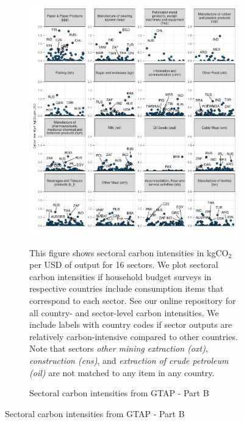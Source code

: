\clearpage

\begin{figure}[ht!]\ContinuedFloat
\begin{subfigure}[b]{\textwidth}
  \centering
  \includegraphics{Analysis_Carbon_Intensities_GTAP/Figure_2.1.1_B_2017B.pdf}
  \caption{Sectoral carbon intensities from GTAP - Part B} \label{fig:B2}  
  \begin{subcaption2}
    This figure shows sectoral carbon intensities in kgCO$_{2}$ per USD of output for 16 sectors. We plot sectoral carbon intensities if household budget surveys in respective countries include consumption items that correspond to each sector. See our online repository for all country- and sector-level carbon intensities. We include labels with country codes if sector outputs are relatively carbon-intensive compared to other countries. Note that sectors \textit{other mining extraction (oxt)}, \textit{construction (cns)}, and \textit{extraction of crude petroleum (oil)} are not matched to any item in any country.
  \end{subcaption2}
\end{subfigure}
\end{figure}

\clearpage


